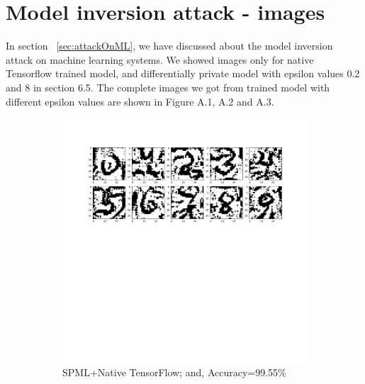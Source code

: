 \section{Model inversion attack - images}
\label{sec:MIA}
In section ~\ref{sec:attackOnML}, we have discussed about the model inversion attack on machine learning systems. We showed images only for native Tensorflow trained model, and differentially private model with epsilon values 0.2 and 8 in section 6.5. The complete images we got from trained model with different epsilon values are shown in Figure A.1, A.2 and A.3.
\begin{figure}[h!]
     \begin{subfigure}{.325\textwidth}
         \includegraphics[width=\textwidth]{images/Native_attack/Mnistattack_native.pdf}
         \vspace{-8em}
         \caption{SPML+Native TensorFlow; and, Accuracy=99.55\%}
         \label{default}
     \end{subfigure}
     \begin{subfigure}{.325\textwidth}

\end{subfigure}
\end{figure}
